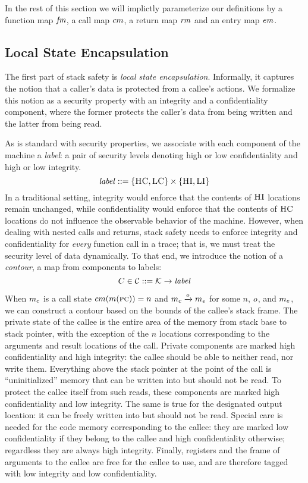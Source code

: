 \documentclass[acmsmall,review,anonymous]{acmart}\settopmatter{printfolios=true,printccs=false,printacmref=false}
\begin{document}
In the rest of this section we will implictly parameterize our
definitions by a function map $\mathit{fm}$, a call map $cm$, a return
map $\mathit{rm}$ and an entry map $\mathit{em}$.

\subsection{Local State Encapsulation}
\label{sec:lse}

The first part of stack safety is {\em local state encapsulation}.
Informally, it captures the notion that a caller's data is
protected from a callee's actions. We formalize this notion
as a security property with an integrity and a confidentiality
component, where the former protects the caller's data from being
written and the latter from being read.

As is standard with security properties, we associate with each
component of the machine a {\em label}: a pair of security levels
denoting high or low confidentiality and high or low integrity.
%
\[\mathit{label} ::= \{\textsc{HC},\textsc{LC}\} \times \{\textsc{HI},\textsc{LI}\}\]
%
In a traditional setting, integrity would enforce that the contents of
$\textsc{HI}$ locations remain unchanged, while confidentiality would
enforce that the contents of $\textsc{HC}$ locations do not influence the
observable behavior of the machine. However, when dealing with nested
calls and returns, stack safety needs to enforce integrity and
confidentiality for {\em every} function call in a trace; that is, we
must treat the security level of data dynamically.
%
To that end, we introduce the notion of a {\em contour}, a map from
components to labels:
%
\[C \in {\mathcal C} ::= {\mathcal K} \rightarrow \mathit{label}\]

When \(m_c\) is a call state \(cm(m(\textsc{pc})) = n\) and
\(m_c \xrightarrow{o} m_e\) for some $n$, $o$, and
$m_e$, we can construct a contour based on the bounds of the
callee's stack frame.
%
The private state of the callee is the entire area of the memory from
stack base to stack pointer, with the exception of the $n$ locations
corresponding to the arguments and result locations of the
call. Private components are marked high confidentiality and high
integrity: the callee should be able to neither read, nor write them.
%
Everything above the stack pointer at the point of the call is
``uninitialized'' memory that can be written into but should not be
read. To protect the callee itself from such reads, these components
are marked high confidentiality and low integrity.
%
The same is true for the designated output location: it can be
freely written into but should not be read.
%
Special care is needed for the code memory corresponding to the
callee: they are marked low confidentiality if they belong to the
callee and high confidentiality otherwise; regardless they are always
high integrity.
%
Finally, registers and the frame of arguments to the callee are free
for the callee to use, and are therefore tagged with low integrity and
low confidentiality.
\end{document}
